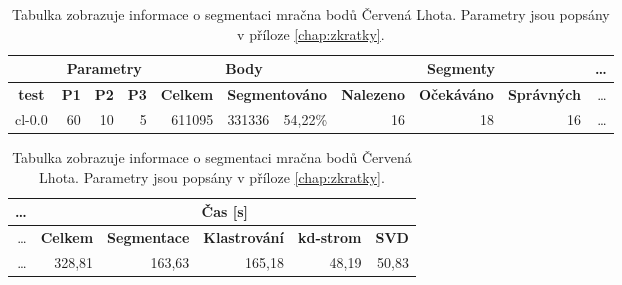 \documentclass[11pt,twoside,a4paper]{book}
\begin{document}
\begin{table}[ht]
\resizebox{\textwidth}{!} {
\begin{tabular}{|r|r|r|r|r|r|r|r|r|r|r|}
\hline
\textbf{} & \multicolumn{ 3}{c|}{\textbf{Parametry}} & \multicolumn{ 3}{c|}{\textbf{Body}} & \multicolumn{ 3}{c|}{\textbf{Segmenty}}&\ldots \\ \hline
\multicolumn{1}{|c|}{\textbf{test}} & \textbf{P1} & \multicolumn{1}{c|}{\textbf{P2}} & \multicolumn{1}{c|}{\textbf{P3}} & \textbf{Celkem} & \multicolumn{ 2}{c|}{\textbf{Segmentováno}} & \textbf{Nalezeno} & \multicolumn{1}{c|}{\textbf{Očekáváno }} & \multicolumn{1}{c|}{\textbf{Správných}}&\ldots \\ \hline
cl-0.0 & \multicolumn{1}{r|}{60} & \multicolumn{1}{r|}{10} & \multicolumn{1}{r|}{5} & \multicolumn{1}{r|}{611095} & \multicolumn{1}{r|}{331336} & \multicolumn{1}{r|}{54,22\%} & \multicolumn{1}{r|}{16} & \multicolumn{1}{r|}{18} & \multicolumn{1}{r|}{16} &\ldots\\ \hline
\end{tabular}
}
\begin{flushright} \scalebox{0.9} {
\begin{tabular}{|r|r|r|r|r|r|}
\hline
\ldots & \multicolumn{ 5}{|c|}{\textbf{Čas [s]}} \\ \hline
\ldots &\textbf{Celkem} & \multicolumn{1}{c|}{\textbf{Segmentace}} & \multicolumn{1}{c|}{\textbf{Klastrování}} & \multicolumn{1}{c|}{\textbf{kd-strom}} & \multicolumn{1}{c|}{\textbf{SVD}} \\ \hline
\ldots &\multicolumn{1}{|r|}{328,81} & \multicolumn{1}{r|}{163,63} & \multicolumn{1}{r|}{165,18} & \multicolumn{1}{r|}{48,19} & \multicolumn{1}{r|}{50,83} \\ \hline
\end{tabular}
}\end{flushright}

\caption{Tabulka zobrazuje informace o segmentaci mračna bodů Červená Lhota. Parametry jsou popsány v příloze \ref{chap:zkratky}.} 
\label{table:test-cl}
\end{table}
\end{document}
